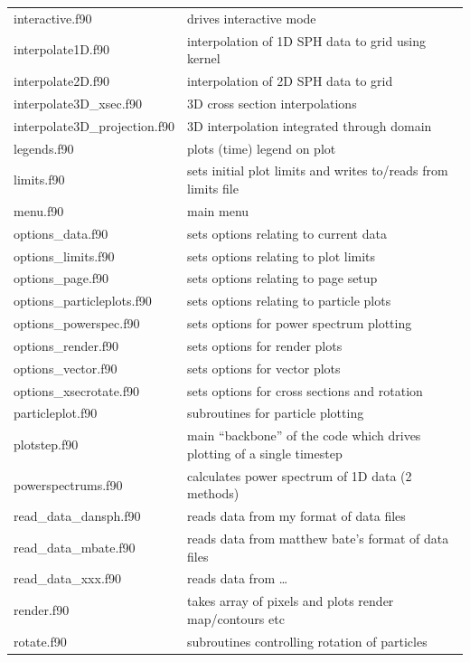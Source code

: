 \documentclass[a4paper,10pt]{article}
\begin{document}
\begin{longtable}{|lp{}|}
     interactive.f90        & drives interactive mode\\
     interpolate1D.f90	 & interpolation of 1D SPH data to grid using kernel\\
     interpolate2D.f90	 & interpolation of 2D SPH data to grid     \\
     interpolate3D\_xsec.f90 & 3D cross section interpolations\\
     interpolate3D\_projection.f90	 & 3D interpolation integrated through domain\\
     legends.f90		       & plots (time) legend on plot\\
     limits.f90                   & sets initial plot limits and writes to/reads from limits file\\
     menu.f90               & main menu\\
     options\_data.f90       & sets options relating to current data\\
     options\_limits.f90     & sets options relating to plot limits\\
     options\_page.f90       & sets options relating to page setup\\
     options\_particleplots.f90 & sets options relating to particle plots\\
     options\_powerspec.f90  & sets options for power spectrum plotting\\
     options\_render.f90	 & sets options for render plots\\
     options\_vector.f90	 & sets options for vector plots\\
     options\_xsecrotate.f90 & sets options for cross sections and rotation\\
     particleplot.f90       & subroutines for particle plotting\\
     plotstep.f90           & main ``backbone'' of the code which drives plotting of a single timestep\\
     powerspectrums.f90     & calculates power spectrum of 1D data (2 methods)\\
     read\_data\_dansph.f90   & reads data from my format of data files\\
     read\_data\_mbate.f90    & reads data from matthew bate's format of data files\\
     read\_data\_xxx.f90 & reads data from \ldots \\ 
     render.f90	 	 & takes array of pixels and plots render map/contours etc\\
     rotate.f90             & subroutines controlling rotation of particles\\

\end{longtable}
\end{document}

